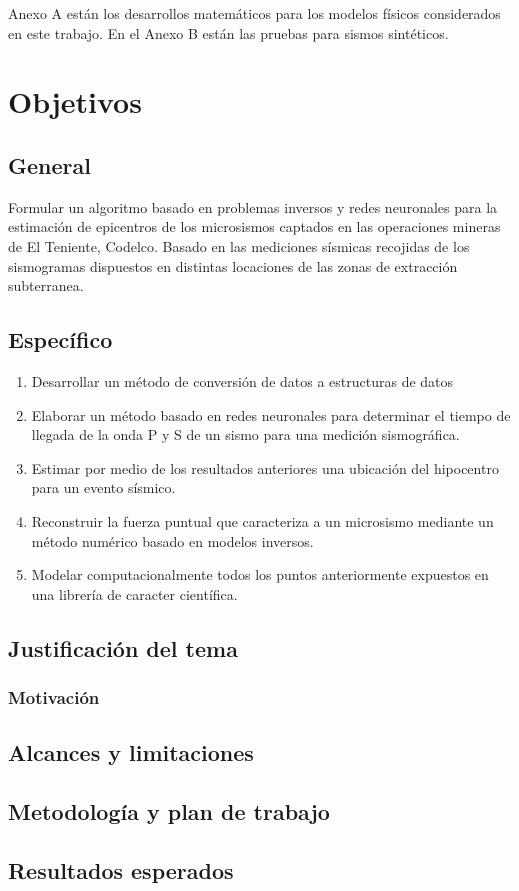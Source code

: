 Anexo A están los desarrollos matemáticos para los modelos físicos considerados
en este trabajo. En el Anexo B están las pruebas para sismos sintéticos.

\section{Objetivos}



\subsection{General}

Formular un algoritmo basado en problemas inversos y redes neuronales para la
estimación de epicentros de los microsismos captados en las operaciones mineras
de El Teniente, Codelco. Basado en las mediciones sísmicas recojidas de los
sismogramas dispuestos en distintas locaciones de las zonas de extracción
subterranea.


\subsection{Específico}

\begin{enumerate}
  \item Desarrollar un método de conversión de datos a estructuras de datos
  \item Elaborar un método basado en redes neuronales para determinar el
  tiempo de llegada de la onda P y S de un sismo para una medición sismográfica.
  \item Estimar por medio de los resultados anteriores una ubicación del
  hipocentro para un evento sísmico.
  \item Reconstruir la fuerza puntual que caracteriza a un microsismo mediante
  un método numérico basado en modelos inversos.
  \item Modelar computacionalmente todos los puntos anteriormente expuestos en
  una librería de caracter científica.
\end{enumerate}


\subsection{Justificación del tema}
\subsubsection{Motivación}

\subsection{Alcances y limitaciones}

\subsection{Metodología y plan de trabajo}

\subsection{Resultados esperados}

